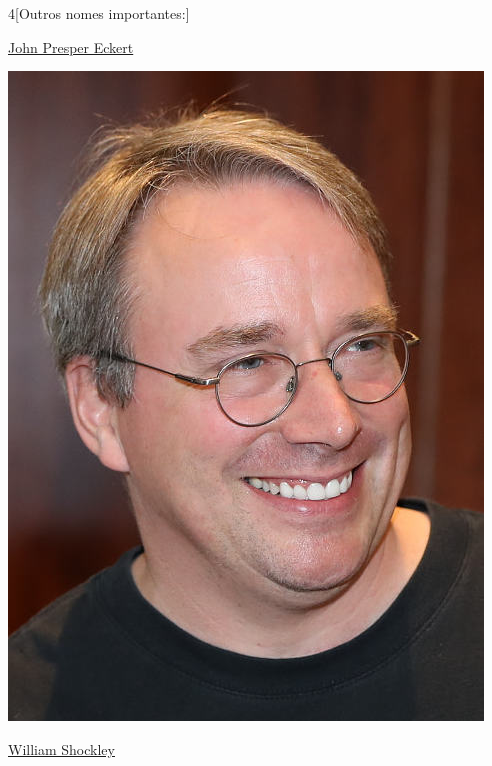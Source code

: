 \begin{multicols}{4}[Outros nomes importantes:]
\vfill\null
\columnbreak				
				
				\href{https://pt.wikipedia.org/wiki/John_Presper_Eckert}{John Presper Eckert}
				
\begin{center}
					\includegraphics[width=.8\columnwidth]{./IMG-GIT/CIENTISTAS/linus.jpeg}
\end{center}
				
\vfill\null
\columnbreak				
				
				\href{https://pt.wikipedia.org/wiki/William_Shockley}{William Shockley}
				

\end{multicols}
